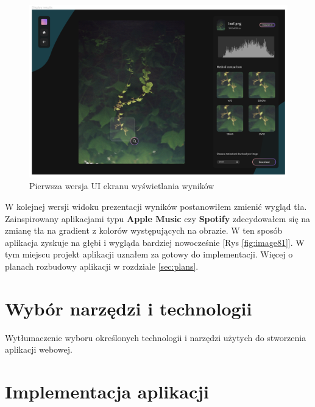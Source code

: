 \begin{figure}[ht]
    \centering
    \begin{minipage}[t]{0.8\linewidth}
        \includegraphics[width=\linewidth]{Rozdziały/06.Aplikacja/Obrazy/UI 1 dsiplay .png}  
        \caption{Pierwsza wersja UI ekranu wyświetlania wyników}
        \label{fig:image86}
    \end{minipage}
\end{figure}

W kolejnej wersji widoku prezentacji wyników postanowiłem zmienić wygląd tła. Zainspirowany aplikacjami typu \textbf{Apple Music} czy \textbf{Spotify} zdecydowałem się na zmianę tła na gradient z kolorów występujących na obrazie. W ten sposób aplikacja zyskuje na głębi i wygląda bardziej nowocześnie [Rys \ref{fig:image81}]. W tym miejscu projekt aplikacji uznałem za gotowy do implementacji. Więcej o planach rozbudowy aplikacji w rozdziale \ref{sec:plans}.



\section{Wybór narzędzi i technologii}







Wytłumaczenie wyboru określonych technologii i narzędzi użytych do stworzenia aplikacji webowej.




\section{Implementacja aplikacji}




